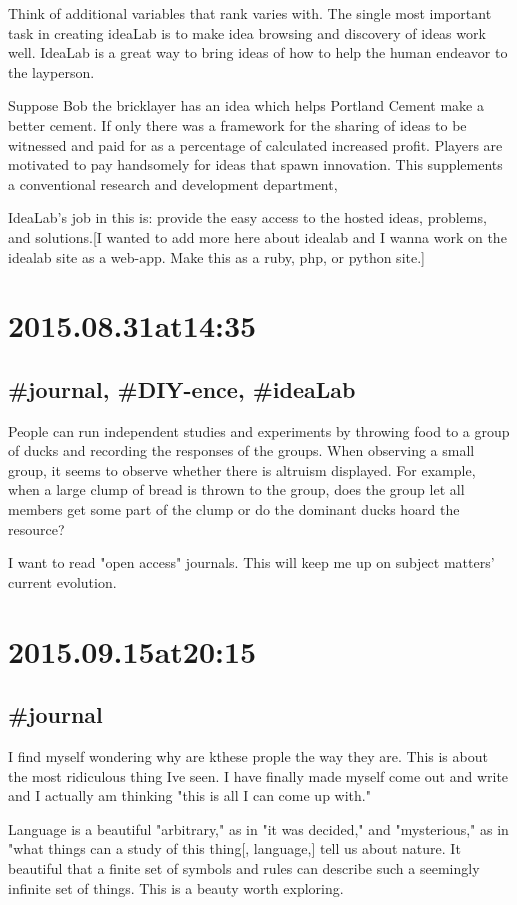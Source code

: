 Think of additional variables that rank varies with. The single most important task in creating ideaLab is to make idea browsing and discovery of ideas work well. IdeaLab is a great way to bring ideas of how to help the human endeavor to the layperson.

Suppose Bob the bricklayer has an idea which helps Portland Cement make a better cement. If only there was a framework for the sharing of ideas to be witnessed and paid for as a percentage of calculated increased profit. Players are motivated to pay handsomely for ideas that spawn innovation. This supplements a conventional research and development department,

IdeaLab's job in this is:  provide the easy access to the hosted ideas, problems, and solutions.[I wanted to add more here about idealab and I wanna work on the idealab site as a web-app. Make this as a ruby, php, or python site.]

\section*{2015.08.31at14:35}
\subsection*{\#journal, \#DIY-ence, \#ideaLab}
People can run independent studies and experiments by throwing food to a group of ducks and recording the responses of the groups. When observing a small group, it seems to observe whether there is altruism displayed. For example, when a large clump of bread is thrown to the group, does the group let all members get some part of the clump or do the dominant ducks hoard the resource?

I want to read "open access" journals. This will keep me up on subject matters' current evolution.

\section*{2015.09.15at20:15}
\subsection*{\#journal}
I find myself wondering why are kthese prople the way they are. This is about the most ridiculous thing Ive seen. I have finally made myself come out and write and I actually am thinking "this is all I can come up with."

Language is a beautiful "arbitrary," as in "it was decided," and "mysterious," as in "what things can a study of this thing[, language,] tell us about nature. It beautiful that a finite set of symbols and rules can describe such a seemingly infinite set of things. This is a beauty worth exploring.

